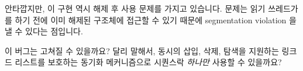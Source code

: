 안타깝지만, 이 구현 역시 해제 후 사용 문제를 가지고 있습니다.
문제는 읽기 쓰레드가  를 하기 전에 이미 해제된 구조체에
접근할 수 있기 때문에 segmentation violation 을 낼 수 있다는 점입니다.

\QuickQuiz{}
	이 버그는 고쳐질 수 있을까요?
	달리 말해서, 동시의 삽입, 삭제, 탐색을 지원하는 링크드 리스트를
	보호하는 동기화 메커니즘으로 시퀀스락 \emph{하나만} 사용할 수 있을까요?
	\iffalse

